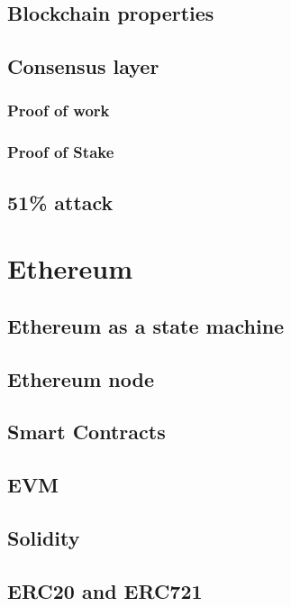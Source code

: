 \subsection{Blockchain properties}

\subsection{Consensus layer}

\subsubsection{Proof of work}

\subsubsection{Proof of Stake}

\subsection{51\% attack}

\section{Ethereum}

\subsection{Ethereum as a state machine}

\subsection{Ethereum node}

\subsection{Smart Contracts}

\subsection{EVM}

\subsection{Solidity}

\subsection{ERC20 and ERC721}






